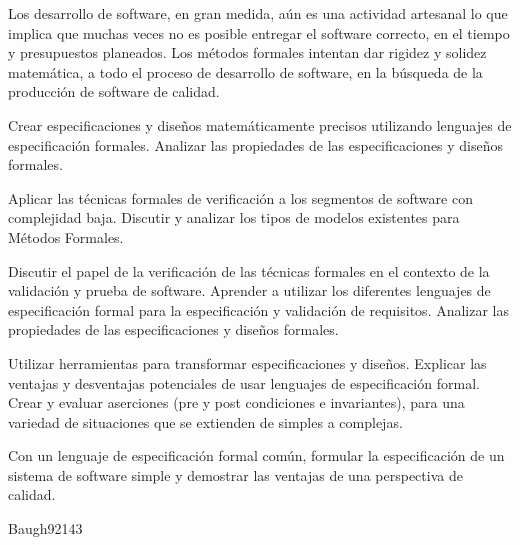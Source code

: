 \begin{syllabus}


\begin{justification}
Los desarrollo de software, en gran medida, aún es una actividad artesanal lo que implica que muchas veces no es posible entregar el software correcto, en el tiempo y presupuestos planeados. Los métodos formales intentan dar rigidez y solidez matemática, a todo el proceso de desarrollo de software, en la búsqueda de la producción de software de calidad.
\end{justification}

\begin{goals}
\item Crear especificaciones y diseños matemáticamente precisos utilizando lenguajes de especificación formales. Analizar las propiedades de las especificaciones y diseños formales.
\item Aplicar las técnicas formales de verificación a los segmentos de software con complejidad baja. Discutir y analizar los tipos de modelos existentes para Métodos Formales.
\item Discutir el papel de la verificación de las técnicas formales en el contexto de la validación y prueba de software. Aprender a utilizar los diferentes lenguajes de especificación formal para la especificación y validación de requisitos. Analizar las propiedades de las especificaciones y diseños formales.
\item Utilizar herramientas para transformar especificaciones y diseños. Explicar las ventajas y desventajas potenciales de usar lenguajes de especificación formal. Crear y evaluar aserciones (pre y post condiciones e invariantes), para una variedad de situaciones que se extienden de simples a complejas.
\item Con un lenguaje de especificación formal común, formular la especificación de un sistema de software simple y demostrar las ventajas de una perspectiva de calidad.
\end{goals}

\begin{outcomes}
\end{outcomes}

\begin{unit}{\SEFormalMethodsDef}{Baugh92}{14}{3}
    \SEFormalMethodsAllTopics
    \SEFormalMethodsAllObjectives
\end{unit}


\end{syllabus}
